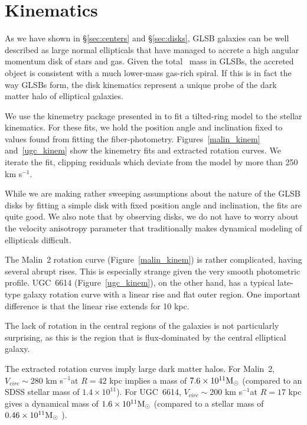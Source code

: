 \documentclass{emulateapj}
\newcommand\msun{\rm{M}_\odot}
\newcommand\kms{km s$^{-1}$}
\newcommand\HI{\ion{H}{1}}
\begin{document}
\section{Kinematics}\label{sec:kinematics}


As we have shown in \S\ref{sec:centers} and \S\ref{sec:disks}, GLSB galaxies can be well described as large normal ellipticals that have managed to accrete a high angular momentum disk of stars and gas.  Given the total \HI\ mass in GLSBs, the accreted object is consistent with a much lower-mass gas-rich spiral.  If this is in fact the way GLSBs form, the disk kinematics represent a unique probe of the dark matter halo of elliptical galaxies.

We use the kinemetry package presented in \citet{Krajn06} to fit a tilted-ring model to the stellar kinematics.  For these fits, we hold the position angle and inclination fixed to values found from fitting the fiber-photometry.  Figures~\ref{malin_kinem} and~\ref{ugc_kinem} show the kinemetry fits and extracted rotation curves.  We iterate the fit, clipping residuals which deviate from the model by more than 250 \kms.  

While we are making rather sweeping assumptions about the nature of the GLSB disks by fitting a simple disk with fixed position angle and inclination, the fits are quite good.  We also note that by observing disks, we do not have to worry about the velocity anisotropy parameter that traditionally makes dynamical modeling of ellipticals difficult.

The Malin~2 rotation curve (Figure~\ref{malin_kinem}) is rather complicated, having several abrupt rises.  This is especially strange given the very smooth photometric profile.  UGC~6614 (Figure~\ref{ugc_kinem}), on the other hand, has a typical late-type galaxy rotation curve with a linear rise and flat outer region.  One important difference is that the linear rise extends for 10 kpc.

The lack of rotation in the central regions of the galaxies is not particularly surprising, as this is the region that is flux-dominated by the central elliptical galaxy.  

The extracted rotation curves imply large dark matter halos.  For Malin~2, $V_{circ}\sim 280$ \kms at $R=42$ kpc implies a mass of $7.6\times 10^{11} \msun$ (compared to an SDSS stellar mass of $1.4\times 10^{11}$).  For UGC~6614, $V_{circ}\sim 200$ \kms at $R=17$ kpc gives a dynamical mass of $1.6\times 10^{11} \msun$ (compared to a stellar mass of $0.46\times 10^{11} \msun$ ).  
\end{document}
